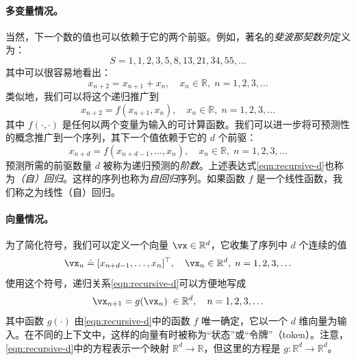 \documentclass[../../book-main.tex]{subfiles}
\begin{document}
\paragraph{多变量情况。}
当然，下一个数的值也可以依赖于它的两个前驱。例如，著名的{\em 斐波那契数列}定义为：
\begin{equation}
    {S} = 1, 1, 2, 3, 5, 8, 13, 21, 34, 55, \ldots
\end{equation}
其中可以很容易地看出：
\begin{equation}
    x_{n+2} = x_{n+1} + x_{n}, \quad  x_n \in \mathbb{R}, \;  n = 1, 2, 3, \ldots
\end{equation}
类似地，我们可以将这个递归推广到 \begin{equation}
    x_{n+2} = f(x_{n+1}, x_{n}), \quad x_n \in \mathbb{R}, \;  n =  1, 2, 3, \ldots
\end{equation}
其中 $f(\cdot,\cdot)$ 是任何以两个变量为输入的可计算函数。我们可以进一步将可预测性的概念推广到一个序列，其下一个值依赖于它的 $d$ 个前驱：
\begin{equation}
    x_{n+d} = f(x_{n+d-1}, \ldots,  x_{n}), \quad  x_n \in \mathbb{R}, \; n =  1, 2, 3, \ldots
    \label{eqn:recursive-d}
\end{equation}
预测所需的前驱数量 $d$ 被称为递归预测的{\em 阶数}。上述表达式\eqref{eqn:recursive-d}也称为{\em （自）回归}。这样的序列也称为{\em 自回归}序列。如果函数 $f$ 是一个线性函数，我们称之为线性（自）回归。

\paragraph{向量情况。} 
为了简化符号，我们可以定义一个向量 $\vx \in \mathbb{R}^d$，它收集了序列中 $d$ 个连续的值 \begin{equation}
    \vx_n \doteq [x_{n+d-1}, \ldots,  x_{n}]^\top, \quad \vx_n \in \mathbb{R}^d, \; n = 1, 2, 3, \ldots
\end{equation}
使用这个符号，递归关系\eqref{eqn:recursive-d}可以方便地写成
\begin{equation}
    \vx_{n+1} = g(\vx_{n}) \; \in \mathbb{R}^d, \quad n =  1, 2, 3, \ldots
    \label{eqn:recursive-v}
\end{equation}
其中函数 $g(\cdot)$ 由\eqref{eqn:recursive-d}中的函数 $f$ 唯一确定，它以一个 $d$ 维向量为输入。在不同的上下文中，这样的向量有时被称为“状态”或“令牌”（token）。注意，\eqref{eqn:recursive-d}中的方程表示一个映射 $\mathbb{R}^d \rightarrow \mathbb{R}$，但这里的方程是 $g: \mathbb{R}^d \rightarrow \mathbb{R}^d$。
\end{document}
